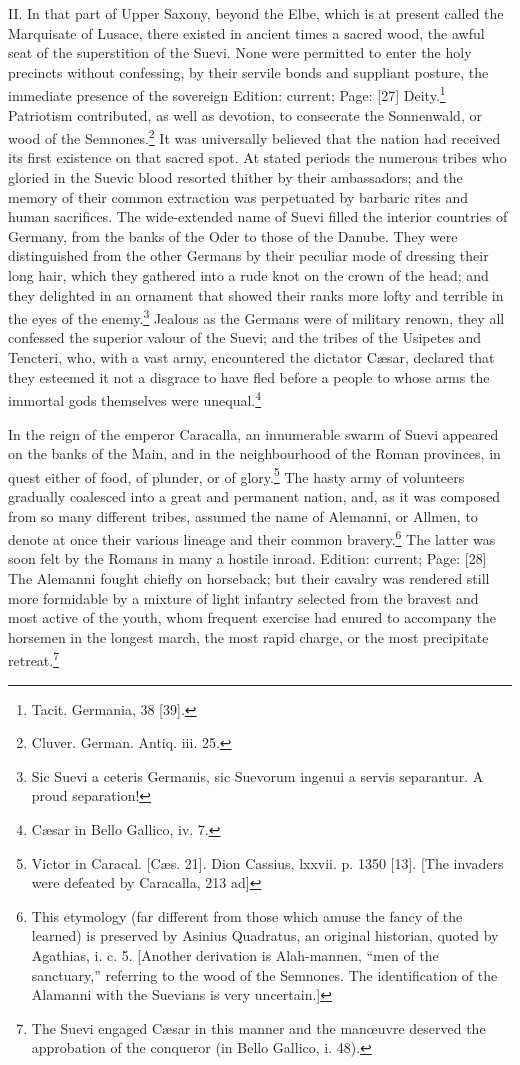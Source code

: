 II. In that part of Upper Saxony, beyond the Elbe, which is at present called the Marquisate of Lusace, there existed in ancient times a sacred wood, the awful seat of the superstition of the Suevi. None were permitted to enter the holy precincts without confessing, by their servile bonds and suppliant posture, the immediate presence of the sovereign Edition: current; Page: [27] Deity.\footnote{Tacit. Germania, 38 [39].} Patriotism contributed, as well as devotion, to consecrate the Sonnenwald, or wood of the Semnones.\footnote{Cluver. German. Antiq. iii. 25.} It was universally believed that the nation had received its first existence on that sacred spot. At stated periods the numerous tribes who gloried in the Suevic blood resorted thither by their ambassadors; and the memory of their common extraction was perpetuated by barbaric rites and human sacrifices. The wide-extended name of Suevi filled the interior countries of Germany, from the banks of the Oder to those of the Danube. They were distinguished from the other Germans by their peculiar mode of dressing their long hair, which they gathered into a rude knot on the crown of the head; and they delighted in an ornament that showed their ranks more lofty and terrible in the eyes of the enemy.\footnote{Sic Suevi a ceteris Germanis, sic Suevorum ingenui a servis separantur. A proud separation!} Jealous as the Germans were of military renown, they all confessed the superior valour of the Suevi; and the tribes of the Usipetes and Tencteri, who, with a vast army, encountered the dictator Cæsar, declared that they esteemed it not a disgrace to have fled before a people to whose arms the immortal gods themselves were unequal.\footnote{Cæsar in Bello Gallico, iv. 7.}

In the reign of the emperor Caracalla, an innumerable swarm of Suevi appeared on the banks of the Main, and in the neighbourhood of the Roman provinces, in quest either of food, of plunder, or of glory.\footnote{Victor in Caracal. [Cæs. 21]. Dion Cassius, lxxvii. p. 1350 [13]. [The invaders were defeated by Caracalla, 213 ad]} The hasty army of volunteers gradually coalesced into a great and permanent nation, and, as it was composed from so many different tribes, assumed the name of Alemanni, or Allmen, to denote at once their various lineage and their common bravery.\footnote{This etymology (far different from those which amuse the fancy of the learned) is preserved by Asinius Quadratus, an original historian, quoted by Agathias, i. c. 5. [Another derivation is Alah-mannen, \texthebrew{“}men of the sanctuary,\texthebrew{}” referring to the wood of the Semnones. The identification of the Alamanni with the Suevians is very uncertain.]} The latter was soon felt by the Romans in many a hostile inroad. Edition: current; Page: [28] The Alemanni fought chiefly on horseback; but their cavalry was rendered still more formidable by a mixture of light infantry selected from the bravest and most active of the youth, whom frequent exercise had enured to accompany the horsemen in the longest march, the most rapid charge, or the most precipitate retreat.\footnote{The Suevi engaged Cæsar in this manner and the manœuvre deserved the approbation of the conqueror (in Bello Gallico, i. 48).}

